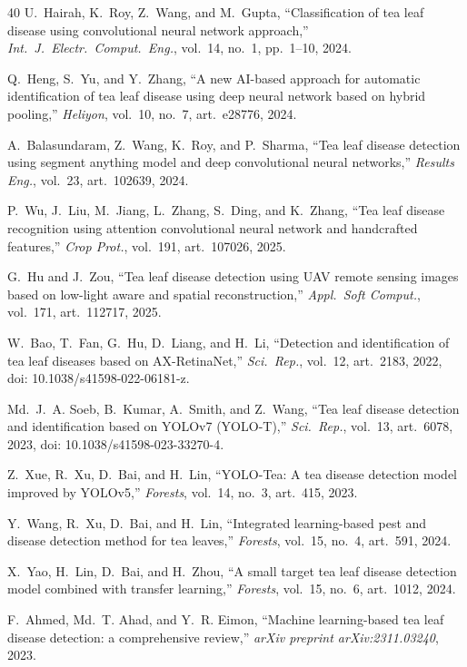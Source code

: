 \documentclass[12pt, a4paper, oneside]{Thesis}
\begin{document}
\begin{thebibliography}{40}
U.~Hairah, K.~Roy, Z.~Wang, and M.~Gupta,
``Classification of tea leaf disease using convolutional neural network approach,''
\emph{Int.\ J.\ Electr.\ Comput.\ Eng.}, vol.\ 14, no.\ 1, pp.\ 1--10, 2024.

Q.~Heng, S.~Yu, and Y.~Zhang,
``A new {AI}-based approach for automatic identification of tea leaf disease
using deep neural network based on hybrid pooling,''
\emph{Heliyon}, vol.\ 10, no.\ 7, art.\ e28776, 2024.

A.~Balasundaram, Z.~Wang, K.~Roy, and P.~Sharma,
``Tea leaf disease detection using segment anything model and deep convolutional
neural networks,''
\emph{Results Eng.}, vol.\ 23, art.\ 102639, 2024.

P.~Wu, J.~Liu, M.~Jiang, L.~Zhang, S.~Ding, and K.~Zhang,
``Tea leaf disease recognition using attention convolutional neural network and
handcrafted features,''
\emph{Crop Prot.}, vol.\ 191, art.\ 107026, 2025.

G.~Hu and J.~Zou,
``Tea leaf disease detection using {UAV} remote sensing images based on
low-light aware and spatial reconstruction,''
\emph{Appl.\ Soft Comput.}, vol.\ 171, art.\ 112717, 2025.

W.~Bao, T.~Fan, G.~Hu, D.~Liang, and H.~Li,
``Detection and identification of tea leaf diseases based on {AX-RetinaNet},''
\emph{Sci.\ Rep.}, vol.\ 12, art.\ 2183, 2022,
doi: 10.1038/s41598-022-06181-z.

Md.~J.~A. Soeb, B.~Kumar, A.~Smith, and Z.~Wang,
``Tea leaf disease detection and identification based on {YOLOv7} ({YOLO-T}),''
\emph{Sci.\ Rep.}, vol.\ 13, art.\ 6078, 2023,
doi: 10.1038/s41598-023-33270-4.

Z.~Xue, R.~Xu, D.~Bai, and H.~Lin,
``{YOLO-Tea}: A tea disease detection model improved by {YOLOv5},''
\emph{Forests}, vol.\ 14, no.\ 3, art.\ 415, 2023.

Y.~Wang, R.~Xu, D.~Bai, and H.~Lin,
``Integrated learning-based pest and disease detection method for tea leaves,''
\emph{Forests}, vol.\ 15, no.\ 4, art.\ 591, 2024.

X.~Yao, H.~Lin, D.~Bai, and H.~Zhou,
``A small target tea leaf disease detection model combined with transfer learning,''
\emph{Forests}, vol.\ 15, no.\ 6, art.\ 1012, 2024.

F.~Ahmed, Md.~T. Ahad, and Y.~R. Eimon,
``Machine learning-based tea leaf disease detection: a comprehensive review,''
\emph{arXiv preprint arXiv:2311.03240}, 2023.


\end{thebibliography}
\end{document}
